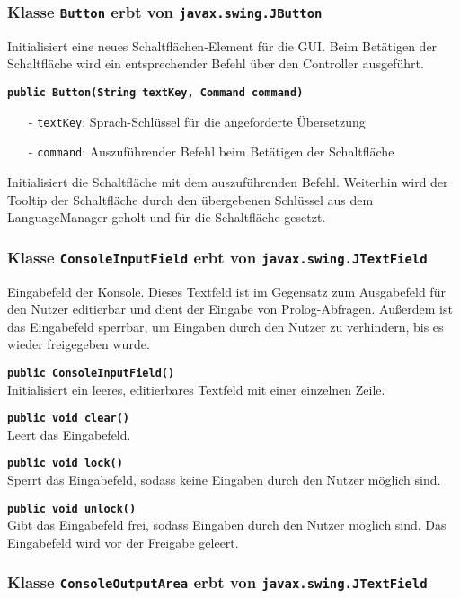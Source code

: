 \documentclass[parskip=full,11pt,twoside]{scrartcl}
\begin{document}
\subsubsection{Klasse \texttt{Button} erbt von \texttt{javax.swing.JButton}}

Initialisiert eine neues Schaltflächen-Element für die GUI. Beim Betätigen der Schaltfläche wird ein entsprechender Befehl über den Controller ausgeführt.

\textbf{\texttt{public Button(String textKey, Command command)}}
\begin{itemize}[noitemsep]
	\item[-] \texttt{textKey}: Sprach-Schlüssel für die angeforderte Übersetzung
	\item[-] \texttt{command}: Auszuführender Befehl beim Betätigen der Schaltfläche
\end{itemize}
Initialisiert die Schaltfläche mit dem auszuführenden Befehl. Weiterhin wird der Tooltip der Schaltfläche durch den übergebenen Schlüssel aus dem LanguageManager geholt und für die Schaltfläche gesetzt.

\subsubsection{Klasse \texttt{ConsoleInputField} erbt von \texttt{javax.swing.JTextField}}

Eingabefeld der Konsole. Dieses Textfeld ist im Gegensatz zum Ausgabefeld für den Nutzer editierbar und dient der Eingabe von Prolog-Abfragen. Außerdem ist das Eingabefeld sperrbar, um Eingaben durch den Nutzer zu verhindern, bis es wieder freigegeben wurde.

\textbf{\texttt{public ConsoleInputField()}}\\
Initialisiert ein leeres, editierbares Textfeld mit einer einzelnen Zeile.

\textbf{\texttt{public void clear()}}\\
Leert das Eingabefeld.

\textbf{\texttt{public void lock()}}\\
Sperrt das Eingabefeld, sodass keine Eingaben durch den Nutzer möglich sind.

\textbf{\texttt{public void unlock()}}\\
Gibt das Eingabefeld frei, sodass Eingaben durch den Nutzer möglich sind. Das Eingabefeld wird vor der Freigabe geleert.

\subsubsection{Klasse \texttt{ConsoleOutputArea} erbt von \texttt{javax.swing.JTextField}}
\end{document}
